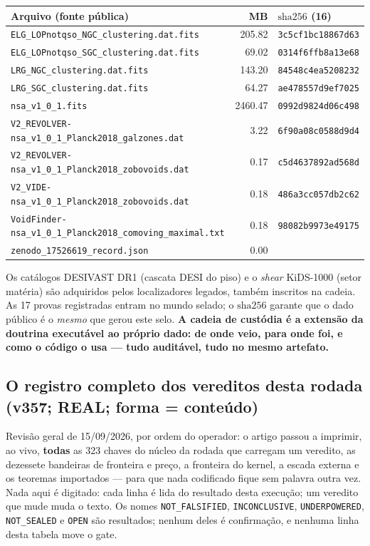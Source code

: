 \documentclass[11pt]{article}
\theoremstyle{definition}\newtheorem{deriv}{Derivação}
\begin{document}
\begin{center}\footnotesize\begin{longtable}{@{}p{}rl@{}}\toprule Arquivo (fonte pública) & MB & $\mathrm{sha}256$ (16) \\ \midrule\endhead \texttt{ELG\_LOPnotqso\_NGC\_clustering.dat.fits} & 205.82 & \texttt{3c5cf1bc18867d63} \\  \texttt{ELG\_LOPnotqso\_SGC\_clustering.dat.fits} & 69.02 & \texttt{0314f6ffb8a13e68} \\  \texttt{LRG\_NGC\_clustering.dat.fits} & 143.20 & \texttt{84548c4ea5208232} \\  \texttt{LRG\_SGC\_clustering.dat.fits} & 64.27 & \texttt{ae478557d9ef7025} \\  \texttt{nsa\_v1\_0\_1.fits} & 2460.47 & \texttt{0992d9824d06c498} \\  \texttt{V2\_REVOLVER-nsa\_v1\_0\_1\_Planck2018\_galzones.dat} & 3.22 & \texttt{6f90a08c0588d9d4} \\  \texttt{V2\_REVOLVER-nsa\_v1\_0\_1\_Planck2018\_zobovoids.dat} & 0.17 & \texttt{c5d4637892ad568d} \\  \texttt{V2\_VIDE-nsa\_v1\_0\_1\_Planck2018\_zobovoids.dat} & 0.18 & \texttt{486a3cc057db2c62} \\  \texttt{VoidFinder-nsa\_v1\_0\_1\_Planck2018\_comoving\_maximal.txt} & 0.18 & \texttt{98082b9973e49175} \\  \texttt{zenodo\_17526619\_record.json} & 0.00 & \texttt{} \\ \bottomrule\end{longtable}\end{center}

Os catálogos DESIVAST DR1 (cascata DESI do piso) e o \emph{shear} KiDS-1000 (setor matéria) são adquiridos pelos localizadores legados, também inscritos na cadeia. As 17 provas registradas entram no mundo selado; o $\mathrm{sha}256$ garante que o dado público é o \emph{mesmo} que gerou este selo. \textbf{A cadeia de custódia é a extensão da doutrina executável ao próprio dado: de onde veio, para onde foi, e como o código o usa --- tudo auditável, tudo no mesmo artefato.}

\subsection*{O registro completo dos vereditos desta rodada (v357; REAL; forma = conteúdo)}

Revisão geral de 15/09/2026, por ordem do operador: o artigo passou a imprimir, ao vivo, \textbf{todas} as 323 chaves do núcleo da rodada que carregam um veredito, as dezessete bandeiras de fronteira e preço, a fronteira do kernel, a escada externa e os teoremas importados --- para que nada codificado fique sem palavra outra vez. Nada aqui é digitado: cada linha é lida do resultado desta execução; um veredito que mude muda o texto. Os nomes \texttt{NOT\_FALSIFIED}, \texttt{INCONCLUSIVE}, \texttt{UNDERPOWERED}, \texttt{NOT\_SEALED} e \texttt{OPEN} são resultados; nenhum deles é confirmação, e nenhuma linha desta tabela move o gate.
\end{document}
